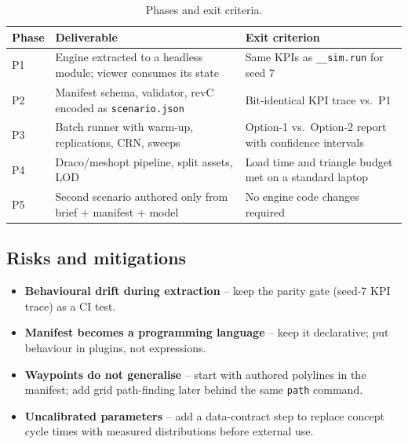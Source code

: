 \documentclass[11pt,a4paper]{article}
\begin{document}
\begin{table}[htbp]
\centering\small
\begin{tabularx}{\linewidth}{@{}l X X@{}}
\toprule
\textbf{Phase} & \textbf{Deliverable} & \textbf{Exit criterion}\\
\midrule
P1 & Engine extracted to a headless module; viewer consumes its state & Same KPIs as \texttt{\_\_sim.run} for seed 7\\
P2 & Manifest schema, validator, revC encoded as \texttt{scenario.json} & Bit-identical KPI trace vs.\ P1\\
P3 & Batch runner with warm-up, replications, CRN, sweeps & Option-1 vs.\ Option-2 report with confidence intervals\\
P4 & Draco/meshopt pipeline, split assets, LOD & Load time and triangle budget met on a standard laptop\\
P5 & Second scenario authored only from brief + manifest + model & No engine code changes required\\
\bottomrule
\end{tabularx}
\caption{Phases and exit criteria.}
\end{table}

\subsection{Risks and mitigations}
\begin{itemize}[leftmargin=*,itemsep=2pt]
  \item \textbf{Behavioural drift during extraction} -- keep the parity gate (seed-7 KPI trace) as a CI test.
  \item \textbf{Manifest becomes a programming language} -- keep it declarative; put behaviour in plugins, not expressions.
  \item \textbf{Waypoints do not generalise} -- start with authored polylines in the manifest; add grid path-finding later behind the same \texttt{path} command.
  \item \textbf{Uncalibrated parameters} -- add a data-contract step to replace concept cycle times with measured distributions before external use.
\end{itemize}
\end{document}
